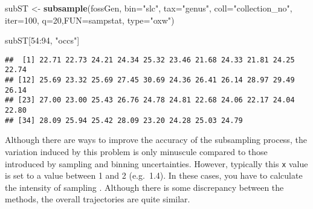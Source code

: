 \documentclass[]{article}
\newenvironment{Shaded}{\begin{snugshade}}{\end{snugshade}}
\newcommand{\KeywordTok}[1]{\textcolor[rgb]{0.13,0.29,0.53}{\textbf{{#1}}}}
\newcommand{\DataTypeTok}[1]{\textcolor[rgb]{0.13,0.29,0.53}{{#1}}}
\newcommand{\DecValTok}[1]{\textcolor[rgb]{0.00,0.00,0.81}{{#1}}}
\newcommand{\StringTok}[1]{\textcolor[rgb]{0.31,0.60,0.02}{{#1}}}
\newcommand{\NormalTok}[1]{{#1}}
\begin{document}
\begin{Shaded}
\begin{Highlighting}[]
\NormalTok{subST <-}\StringTok{ }\KeywordTok{subsample}\NormalTok{(fossGen, }\DataTypeTok{bin=}\StringTok{"slc"}\NormalTok{, }\DataTypeTok{tax=}\StringTok{"genus"}\NormalTok{, }\DataTypeTok{coll=}\StringTok{"collection_no"}\NormalTok{, }
  \DataTypeTok{iter=}\DecValTok{100}\NormalTok{, }\DataTypeTok{q=}\DecValTok{20}\NormalTok{,}\DataTypeTok{FUN=}\NormalTok{sampstat, }\DataTypeTok{type=}\StringTok{"oxw"}\NormalTok{)}
\end{Highlighting}
\end{Shaded}

\begin{Shaded}
\begin{Highlighting}[]
\NormalTok{subST[}\DecValTok{54}\NormalTok{:}\DecValTok{94}\NormalTok{, }\StringTok{"occs"}\NormalTok{]}
\end{Highlighting}
\end{Shaded}

\begin{verbatim}
##  [1] 22.71 22.73 24.21 24.34 25.32 23.46 21.68 24.33 21.81 24.25 22.74
## [12] 25.69 23.32 25.69 27.45 30.69 24.36 26.41 26.14 28.97 29.49 26.14
## [23] 27.00 23.00 25.43 26.76 24.78 24.81 22.68 24.06 22.17 24.04 22.80
## [34] 28.09 25.94 25.42 28.09 23.20 24.28 25.03 24.79
\end{verbatim}

Although there are ways to improve the accuracy of the subsampling
process, the variation induced by this problem is only minuscule
compared to those introduced by sampling and binning uncertainties.
However, typically this \texttt{x} value is set to a value between 1 and
2 (e.g.~1.4). In these cases, you have to calculate the intensity of
sampling . Although there is some discrepancy between the methods, the
overall trajectories are quite similar.
\end{document}
